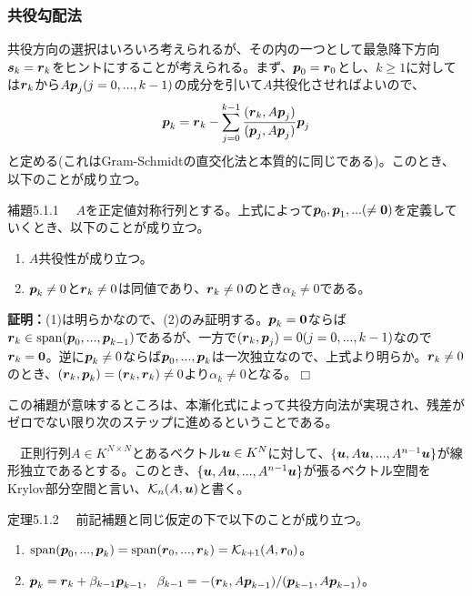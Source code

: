 \documentclass[dvipdfmx, 9pt, a4paper]{jsarticle}
\numberwithin{equation}{subsection}
\newcommand{\bm}[1]{{\mbox{\boldmath $#1$}}}
\def\qed{\hfill $\Box$}
\begin{document}
\subsubsection{共役勾配法}
共役方向の選択はいろいろ考えられるが、その内の一つとして最急降下方向$\bm s_k=\bm r_k$をヒントにすることが考えられる。まず、$\bm p_0=\bm r_0$とし、$k\geq 1$に対しては$\bm r_k$から$A\bm p_j(j=0, ..., k-1)$の成分を引いて$A$共役化させればよいので、
\begin{equation}
\bm p_k=\bm r_k-\sum_{j=0}^{k-1}\frac{(\bm r_k, A\bm p_j)}{(\bm p_j, A\bm p_j)}\bm p_j
\end{equation}
と定める(これはGram-Schmidtの直交化法と本質的に同じである)。このとき、以下のことが成り立つ。
\begin{itembox}[l]{補題5.1.1}
　$A$を正定値対称行列とする。上式によって$\bm p_0, \bm p_1, ...(\neq \bm 0)$を定義していくとき、以下のことが成り立つ。
\begin{enumerate}
\item $A$共役性が成り立つ。
\item $\bm p_k \neq 0$と$\bm r_k \neq 0$は同値であり、$\bm r_k \neq 0$のとき$\alpha_k \neq 0$である。
\end{enumerate}
\end{itembox}
{\bf 証明：}(1)は明らかなので、(2)のみ証明する。$\bm p_k = \bm 0$ならば$\bm r_k \in {\rm span}(\bm p_0, ..., \bm p_{k-1})$であるが、一方で$(\bm r_k, \bm p_j)=0(j=0, ..., k-1)$なので$\bm r_k=\bm 0$。逆に$\bm p_k \neq 0$ならば$\bm p_0, ..., \bm p_k$は一次独立なので、上式より明らか。$\bm r_k \neq 0$のとき、$(\bm r_k, \bm p_k)=(\bm r_k, \bm r_k)\neq 0$より$\alpha_k \neq 0$となる。\qed \par
この補題が意味するところは、本漸化式によって共役方向法が実現され、残差がゼロでない限り次のステップに進めるということである。\par
\begin{tcolorbox}[title=Krylov部分空間]
　正則行列$A \in K^{N \times N}$とあるベクトル$\bm u \in K^N$に対して、$\{\bm u, A\bm u, ..., A^{n-1}\bm u\}$が線形独立であるとする。このとき、$\{\bm u, A\bm u, ..., A^{n-1}\bm u\}$が張るベクトル空間をKrylov部分空間と言い、$\mathcal{K}_n(A, \bm u)$と書く。
\end{tcolorbox}
\begin{itembox}[l]{定理5.1.2}
　前記補題と同じ仮定の下で以下のことが成り立つ。
\begin{enumerate}
\item ${\rm span}(\bm p_0, ..., \bm p_k)={\rm span}(\bm r_0, ..., \bm r_k)=\mathcal{K}_{k+1}(A, \bm r_0)$。
\item $\bm p_k=\bm r_k+\beta_{k-1}\bm p_{k-1},~~\beta_{k-1}=-(\bm r_k, A\bm p_{k-1})/(\bm p_{k-1}, A\bm p_{k-1})$。
\end{enumerate}
\end{itembox}
\end{document}
